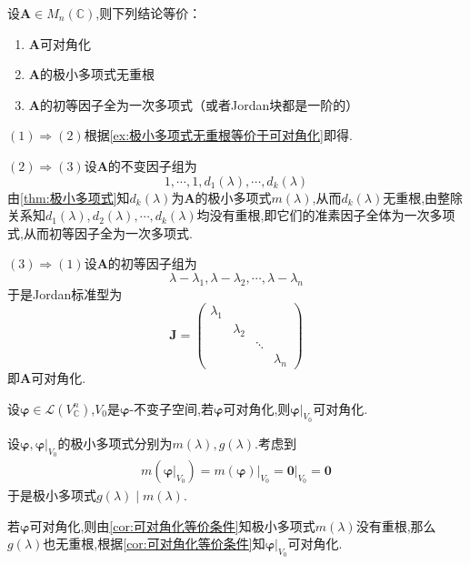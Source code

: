 \begin{green}
\begin{corollary}[可对角化等价条件]\label{cor:可对角化等价条件}
    设$\bm{A}\in M_n\left(\mathbb{C}\right)$,则下列结论等价：

    \begin{enumerate}[label={\textup{(\arabic*)}}]
        \item $\bm{A}$可对角化
        \item $ \bm{A}$的极小多项式无重根
        \item $\bm{A}$的初等因子全为一次多项式（或者\textup{Jordan}块都是一阶的）
    \end{enumerate}
\end{corollary}
\begin{Proof}
    $(1)\Longrightarrow (2)$根据\cref{ex:极小多项式无重根等价于可对角化}即得.

    $(2)\Longrightarrow (3)$设$\bm{A}$的不变因子组为\[
    1,\cdots,1,d_1\left(\lambda\right),\cdots,d_k\left(\lambda\right)
    \]由\cref{thm:极小多项式}知$d_k\left(\lambda\right)$为$\bm{A}$的极小多项式$m\left(\lambda\right)$,从而$d_k\left(\lambda\right)$无重根,由整除关系知$d_1\left(\lambda\right),d_2\left(\lambda\right),\cdots,d_k\left(\lambda\right)$均没有重根,即它们的准素因子全体为一次多项式,从而初等因子全为一次多项式.

    $(3)\Longrightarrow (1)$设$\bm{A}$的初等因子组为\[
    \lambda-\lambda_1,\lambda-\lambda_2,\cdots,\lambda-\lambda_n
    \]于是Jordan标准型为\[
    \bm{J}=\begin{pmatrix}
        \lambda_1&&&\\
        &\lambda_2&&\\
        &&\ddots&\\
        &&&\lambda_n
    \end{pmatrix}
    \]即$\bm{A}$可对角化.
\end{Proof}
\end{green}
\begin{green}
\begin{corollary}[限制可对角化]\label{cor:限制可对角化}
    设$\bm{\varphi}\in \mathcal{L}\left(
        V_{\mathbb{C}}^n
    \right)$,$V_0$是$\bm{\varphi}$-不变子空间,若$\bm{\varphi}$可对角化,则$\displaystyle \bm{\varphi}\Big|_{V_0}$可对角化.
\end{corollary}
\begin{Proof}
    设$\bm{\varphi},\bm{\varphi}\Big|_{V_0}$的极小多项式分别为$m\left(\lambda\right),g\left(\lambda\right).$考虑到\begin{align*}
        m\left(\bm{\varphi}\Big|_{V_0}\right)=m\left(\bm{\varphi}\right)\Big|_{V_0}=\bm{0}\Big|_{V_0}=\bm{0}
    \end{align*}于是极小多项式$g\left(\lambda\right)\mid m\left(\lambda\right).$

    若$\bm{\varphi}$可对角化,则由\cref{cor:可对角化等价条件}知极小多项式$m\left(\lambda\right)$没有重根,那么$g\left(\lambda\right)$也无重根,根据\cref{cor:可对角化等价条件}知$\bm{\varphi}\Big|_{V_0}$可对角化.
\end{Proof}
\end{green}
